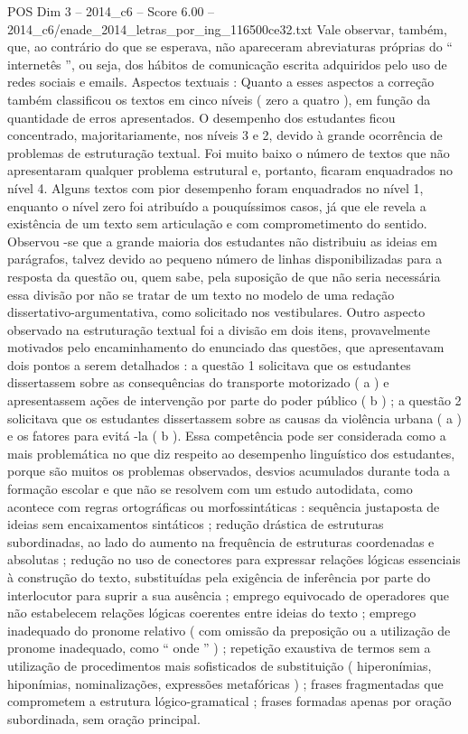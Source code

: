 \begin{textsample}{POS Dim 3 – 2014\_c6 – Score 6.00 – 2014\_c6/enade\_2014\_letras\_por\_ing\_116500ce32.txt}
Vale observar, também, que, ao contrário do que se esperava, não apareceram abreviaturas próprias do “ internetês ”, ou seja, dos hábitos de comunicação escrita adquiridos pelo uso de redes sociais e emails.
Aspectos textuais : Quanto a esses aspectos a correção também classificou os textos em cinco níveis ( zero a quatro ), em função da quantidade de erros apresentados.
O desempenho dos estudantes ficou concentrado, majoritariamente, nos níveis 3 e 2, devido à grande ocorrência de problemas de estruturação textual.
Foi muito baixo o número de textos que não apresentaram qualquer problema estrutural e, portanto, ficaram enquadrados no nível 4.
Alguns textos com pior desempenho foram enquadrados no nível 1, enquanto o nível zero foi atribuído a pouquíssimos casos, já que ele revela a existência de um texto sem articulação e com comprometimento do sentido.
Observou -se que a grande maioria dos estudantes não distribuiu as ideias em parágrafos, talvez devido ao pequeno número de linhas disponibilizadas para a resposta da questão ou, quem sabe, pela suposição de que não seria necessária essa divisão por não se tratar de um texto no modelo de uma redação dissertativo-argumentativa, como solicitado nos vestibulares.
Outro aspecto observado na estruturação textual foi a divisão em dois itens, provavelmente motivados pelo encaminhamento do enunciado das questões, que apresentavam dois pontos a serem detalhados : a questão 1 solicitava que os estudantes dissertassem sobre as consequências do transporte motorizado ( a ) e apresentassem ações de intervenção por parte do poder público ( b ) ; a questão 2 solicitava que os estudantes dissertassem sobre as causas da violência urbana ( a ) e os fatores para evitá -la ( b ).
Essa competência pode ser considerada como a mais problemática no que diz respeito ao desempenho linguístico dos estudantes, porque são muitos os problemas observados, desvios acumulados durante toda a formação escolar e que não se resolvem com um estudo autodidata, como acontece com regras ortográficas ou morfossintáticas : sequência justaposta de ideias sem encaixamentos sintáticos ; redução drástica de estruturas subordinadas, ao lado do aumento na frequência de estruturas coordenadas e absolutas ; redução no uso de conectores para expressar relações lógicas essenciais à construção do texto, substituídas pela exigência de inferência por parte do interlocutor para suprir a sua ausência ; emprego equivocado de operadores que não estabelecem relações lógicas coerentes entre ideias do texto ; emprego inadequado do pronome relativo ( com omissão da preposição ou a utilização de pronome inadequado, como “ onde ” ) ; repetição exaustiva de termos sem a utilização de procedimentos mais sofisticados de substituição ( hiperonímias, hiponímias, nominalizações, expressões metafóricas ) ; frases fragmentadas que comprometem a estrutura lógico-gramatical ; frases formadas apenas por oração subordinada, sem oração principal.

\end{textsample}
